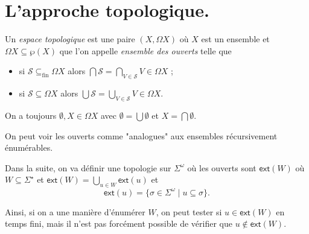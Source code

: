 \documentclass[./main]{subfiles}
\begin{document}
  \chapter{L'approche topologique.}

  \begin{defn}
    Un \textit{espace topologique} est une paire $(X, \Omega X)$ où $X$ est un ensemble et $\Omega X \subseteq \wp(X)$ que l'on appelle \textit{ensemble des ouverts} telle que
    \begin{itemize}
      \item si $\mathcal{S} \subseteq_\mathrm{fin} \Omega X$ alors $\bigcap \mathcal{S} = \bigcap_{V \in \mathcal{S}} V \in \Omega X$ ;
      \item si $\mathcal{S} \subseteq \Omega X$ alors $\bigcup \mathcal{S} = \bigcup_{V \in \mathcal{S}} V \in \Omega X$.
    \end{itemize}
  \end{defn}

  \begin{rmk}
    On a toujours $\emptyset, X \in \Omega X$ avec $\emptyset = \bigcup \emptyset$ et $X = \bigcap \emptyset$.
  \end{rmk}

  \begin{rmk}[Intuition]
    On peut voir les ouverts comme "analogues" aux ensembles récursivement énumérables.

    Dans la suite, on va définir une topologie  sur $\Sigma^\omega$ où les ouverts sont  $\mathsf{ext}(W)$ où $W \subseteq \Sigma^\star$ et $\mathsf{ext}(W) = \bigcup_{u \in W} \mathsf{ext}(u)$ et 
    \[
    \mathsf{ext}(u) = \{\sigma \in \Sigma^\omega  \mid u \subseteq \sigma\} 
    .\]

    Ainsi, si on a une manière d'énumérer $W$, on peut tester si $u \in \mathsf{ext}(W)$ en temps fini, mais il n'est pas forcément possible de vérifier que $u \not\in \mathsf{ext}(W)$.
  \end{rmk}
\end{document}
